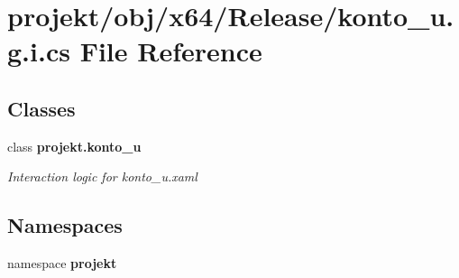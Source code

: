 \section{projekt/obj/x64/\+Release/konto\+\_\+u.g.\+i.\+cs File Reference}
\label{x64_2Release_2konto__u_8g_8i_8cs}
\subsection*{Classes}
\begin{DoxyCompactItemize}
\item 
class \textbf{ projekt.\+konto\+\_\+u}
\begin{DoxyCompactList}\small\item\em Interaction logic for konto\+\_\+u.\+xaml \end{DoxyCompactList}\end{DoxyCompactItemize}
\subsection*{Namespaces}
\begin{DoxyCompactItemize}
\item 
namespace \textbf{ projekt}
\end{DoxyCompactItemize}
